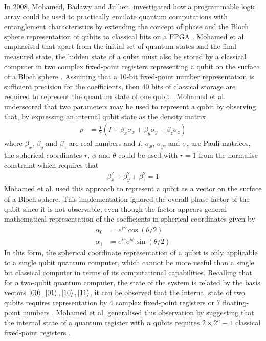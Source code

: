 In 2008, Mohamed, Badawy and Jullien, investigated how a programmable logic array could be used to practically emulate quantum computations with entanglement characteristics by extending the concept of phase and the Bloch sphere representation of qubits to classical bits on a FPGA \cite{mohamed2009using}. Mohamed et al. emphasised that apart from the initial set of quantum states and the final measured state, the hidden state of a qubit must also be stored by a classical computer in two complex fixed-point registers representing a qubit on the surface of a Bloch sphere \cite{mohamed2009using}. Assuming that a 10-bit fixed-point number representation is sufficient precision for the coefficients, then 40 bits of classical storage are required to represent the quantum state of one qubit \cite{mohamed2009using}. Mohamed et al. underscored that two parameters may be used to represent a qubit by observing that, by expressing an internal qubit state as the density matrix
\begin{align}\label{eqn:density-matrix}
	\rho	& = \frac{1}{2}\left(I + \beta_x\sigma_x + \beta_y\sigma_y + \beta_z\sigma_z\right)
\end{align}
where $\beta_x$, $\beta_y$ and $\beta_z$ are real numbers and $I$, $\sigma_x$, $\sigma_y$, and $\sigma_z$ are Pauli matrices, the spherical coordinates $r$, $\phi$ and $\theta$ could be used with $r = 1$ from the normalise constraint which requires that
\begin{align}
	\beta_x^2 + \beta_y^2 + \beta_z^2 = 1\nonumber
\end{align}
Mohamed et al. used this approach to represent a qubit as a vector on the surface of a Bloch sphere. This implementation ignored the overall phase factor of the qubit since it is not observable, even though the factor appears general mathematical representation of the coefficients in spherical coordinates given by
\begin{align}\label{eqn:qubit-spherical-coordinates}
	\alpha_0	& = e^{i\gamma}\cos(\theta/2)\\
	\alpha_1  & = e^{i\gamma}e^{i\phi}\sin(\theta/2)
\end{align}
In this form, the spherical coordinate representation of a qubit is only applicable to a single qubit quantum computer, which cannot be more useful than a single bit classical computer in terms of its computational capabilities. Recalling that for a two-qubit quantum computer, the state of the system is related by the basis vectors $\ket{00}, \ket{01}, \ket{10}, \ket{11}$, it can be observed that the internal state of two qubits requires representation by 4 complex fixed-point registers or 7 floating-point numbers \cite{mohamed2009using}. Mohamed et al. generalised this observation by suggesting that the internal state of a quantum register with $n$ qubits requires $2\times2^n - 1$ classical fixed-point registers \cite{mohamed2009using}.


